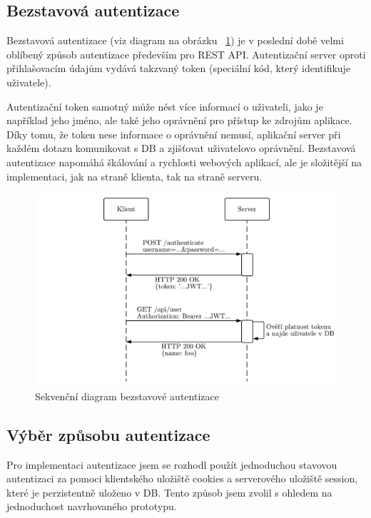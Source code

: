 \subsection{Bezstavová autentizace}\label{subsec:bezstavováAutentizace}
Bezstavová autentizace (viz diagram na obrázku ~\ref{fig:statelessAuthentication}) je v poslední době velmi oblíbený způsob autentizace především pro \gls{REST} \gls{API}.
Autentizační server oproti přihlašovacím údajům vydává takzvaný token (speciální kód, který identifikuje uživatele).

Autentizační token samotný může nést více informací o uživateli, jako je například jeho jméno, ale také jeho oprávnění pro přístup ke zdrojům aplikace.
Díky tomu, že token nese informace o oprávnění nemusí, aplikační server při každém dotazu komunikovat s DB a zjišťovat uživatelovo oprávnění.
Bezstavová autentizace napomáhá škálování a rychlosti webových aplikací, ale je složitější na implementaci, jak na straně klienta, tak na straně serveru.

\begin{figure}[ht!]
    \centering
    \includegraphics[width=.9\textwidth]{partials/navrh/statelessAuthentication.pdf}
    \caption{Sekvenční diagram bezstavové autentizace}\label{fig:statelessAuthentication}
\end{figure}

\subsection{Výběr způsobu autentizace}\label{subsec:výběrZpůsobuAutentizace}
Pro implementaci autentizace jsem se rozhodl použít jednoduchou stavovou autentizaci za pomoci klientského uložiště cookies a serverového uložiště session, které je perzistentně uloženo v DB.
Tento způsob jsem zvolil s ohledem na jednoduchost navrhovaného prototypu.

